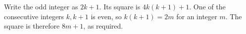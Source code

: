 Write the odd integer as $2k+1$. Its square is $4k(k+1)+1$. One of the consecutive integers $k,k+1$ is even, so $k(k+1)=2m$ for an integer $m$. The square is therefore $8m+1$, as required.
